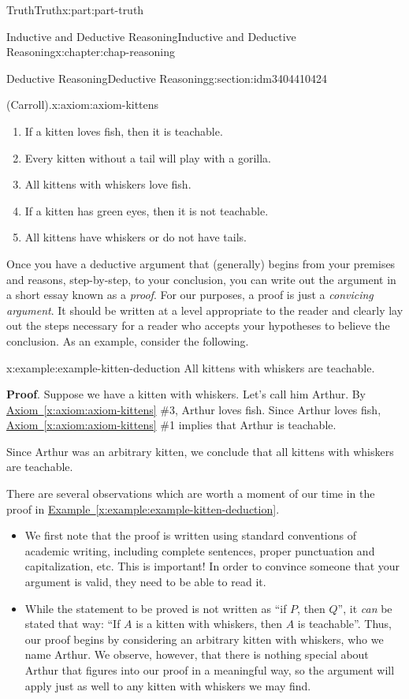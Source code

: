 \documentclass[oneside,10pt,]{book}
\newcommand{\xreffont}{\relax}
\newcommand{\terminology}[1]{\textbf{#1}}
\numberwithin{equation}{section}
\begin{document}
\begin{partptx}{Truth}{}{Truth}{}{}{x:part:part-truth}
\begin{chapterptx}{Inductive and Deductive Reasoning}{}{Inductive and Deductive Reasoning}{}{}{x:chapter:chap-reasoning}
\begin{sectionptx}{Deductive Reasoning}{}{Deductive Reasoning}{}{}{g:section:idm3404410424}
\begin{axiom}{(Carroll).}{}{x:axiom:axiom-kittens}
\begin{enumerate}
\item{}If a kitten loves fish, then it is teachable.%
\item{}Every kitten without a tail will play with a gorilla.%
\item{}All kittens with whiskers love fish.%
\item{}If a kitten has green eyes, then it is not teachable.%
\item{}All kittens have whiskers or do not have tails.%
\end{enumerate}
\end{axiom}
Once you have a deductive argument that (generally) begins from your premises and reasons, step-by-step, to your conclusion, you can write out the argument in a short essay known as a \emph{proof}. For our purposes, a proof is just a \emph{convicing argument}. It should be written at a level appropriate to the reader and clearly lay out the steps necessary for a reader who accepts your hypotheses to believe the conclusion. As an example, consider the following.%
\begin{example}{}{x:example:example-kitten-deduction}%
All kittens with whiskers are teachable.%
\par
\terminology{Proof}. Suppose we have a kitten with whiskers. Let's call him Arthur. By \hyperref[x:axiom:axiom-kittens]{Axiom~{\xreffont\ref{x:axiom:axiom-kittens}}} \#3, Arthur loves fish. Since Arthur loves fish, \hyperref[x:axiom:axiom-kittens]{Axiom~{\xreffont\ref{x:axiom:axiom-kittens}}} \#1 implies that Arthur is teachable.%
\par
Since Arthur was an arbitrary kitten, we conclude that all kittens with whiskers are teachable.%
\end{example}
There are several observations which are worth a moment of our time in the proof in \hyperref[x:example:example-kitten-deduction]{Example~{\xreffont\ref{x:example:example-kitten-deduction}}}.%
%
\begin{itemize}[label=\textbullet]
\item{}We first note that the proof is written using standard conventions of academic writing, including complete sentences, proper punctuation and capitalization, etc. This is important! In order to convince someone that your argument is valid, they need to be able to read it.%
\item{}While the statement to be proved is not written as ``if \(P\), then \(Q\)'', it \emph{can} be stated that way: ``If \(A\) is a kitten with whiskers, then \(A\) is teachable''. Thus, our proof begins by considering an arbitrary kitten with whiskers, who we name Arthur. We observe, however, that there is nothing special about Arthur that figures into our proof in a meaningful way, so the argument will apply just as well to any kitten with whiskers we may find.%

\end{itemize}
\end{sectionptx}
\end{chapterptx}
\end{partptx}
\end{document}
